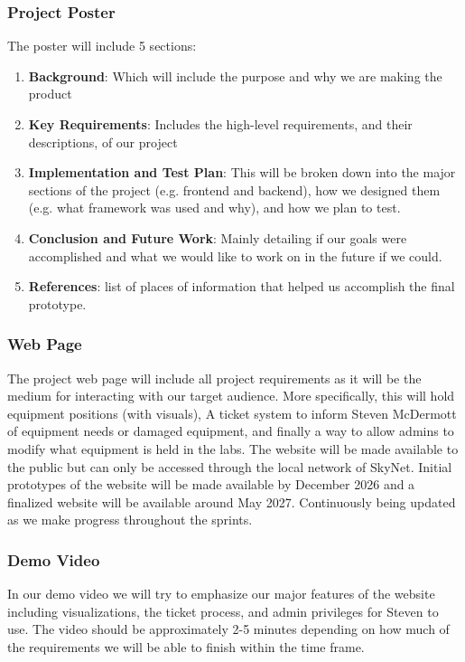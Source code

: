 \subsubsection{Project Poster}
The poster will include 5 sections:
\begin{enumerate}
    \item \textbf{Background}: Which will include the purpose and why we are making the product
    \item \textbf{Key Requirements}: Includes the high-level requirements, and their descriptions, of our project
    \item \textbf{Implementation and Test Plan}: This will be broken down into the major sections of the project (e.g. frontend and backend), how we designed them (e.g. what framework was used and why), and how we plan to test.
    \item \textbf{Conclusion and Future Work}: Mainly detailing if our goals were accomplished and what we would like to work on in the future if we could.
    \item \textbf{References}: list of places of information that helped us accomplish the final prototype.
\end{enumerate}

\subsubsection{Web Page}
The project web page will include all project requirements as it will be the medium for interacting with our target audience. More specifically, this will hold equipment positions (with visuals), A ticket system to inform Steven McDermott of equipment needs or damaged equipment, and finally a way to allow admins to modify what equipment is held in the labs. The website will be made available to the public but can only be accessed through the local network of SkyNet. Initial prototypes of the website will be made available by December 2026 and a finalized website will be available around May 2027. Continuously being updated as we make progress throughout the sprints.

\subsubsection{Demo Video}
In our demo video we will try to emphasize our major features of the website including visualizations, the ticket process, and admin privileges for Steven to use. The video should be approximately 2-5 minutes depending on how much of the requirements we will be able to finish within the time frame. 

